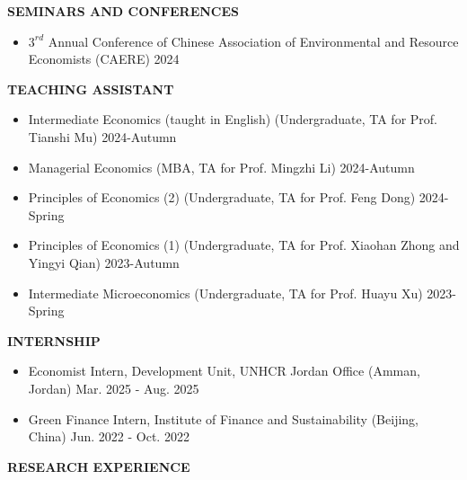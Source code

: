 \documentclass[UTF8]{ctexbook}
\begin{document}
\vspace{12pt}


\begin{center}
    \textbf{SEMINARS AND CONFERENCES}
\end{center}

\begin{itemize}
    \item $3^{rd}$ Annual Conference of Chinese Association of Environmental and Resource Economists (CAERE) \hfill 2024
\end{itemize}


\vspace{12pt}

\begin{center}
    \textbf{TEACHING ASSISTANT}
\end{center}


\begin{itemize}
    \item Intermediate Economics (taught in English) (Undergraduate, TA for Prof. Tianshi Mu) \hfill 2024-Autumn
    \item Managerial Economics (MBA, TA for Prof. Mingzhi Li) \hfill 2024-Autumn
    \item Principles of Economics (2) (Undergraduate, TA for Prof. Feng Dong) \hfill 2024-Spring
    \item Principles of Economics (1) (Undergraduate, TA for Prof. Xiaohan Zhong and Yingyi Qian) \hfill 2023-Autumn
    \item Intermediate Microeconomics (Undergraduate, TA for Prof. Huayu Xu) \hfill 2023-Spring
\end{itemize}

\vspace{12pt}

\begin{center}
    \textbf{INTERNSHIP}
\end{center}

\begin{itemize}
    \item Economist Intern, Development Unit, UNHCR Jordan Office (Amman, Jordan) \hfill Mar. 2025 - Aug. 2025
    \item Green Finance Intern, Institute of Finance and Sustainability (Beijing, China) \hfill Jun. 2022 - Oct. 2022
\end{itemize}

\vspace{12pt}

\begin{center}
    \textbf{RESEARCH EXPERIENCE}
\end{center}
\end{document}
